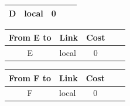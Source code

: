 \begin{enumerate}
\begin{enumerate}
\begin{table}[H]
\begin{tabular}{@{}clcll@{}}
                D                    & local                    & 0                    \\ \bottomrule
            \end{tabular}
            \hfill
            \begin{tabular}{@{}clcll@{}}
                \toprule
                From E to            & \multicolumn{1}{c}{Link} & Cost                 \\ \midrule
                E                    & local                    & 0                    \\ \bottomrule
            \end{tabular}
            \hfill
            \begin{tabular}{@{}clcll@{}}
                \toprule
                From F to            & \multicolumn{1}{c}{Link} & Cost                 \\ \midrule
                F                    & local                    & 0                    \\ \bottomrule
            \end{tabular}
        \end{table}


\end{enumerate}
\end{enumerate}
